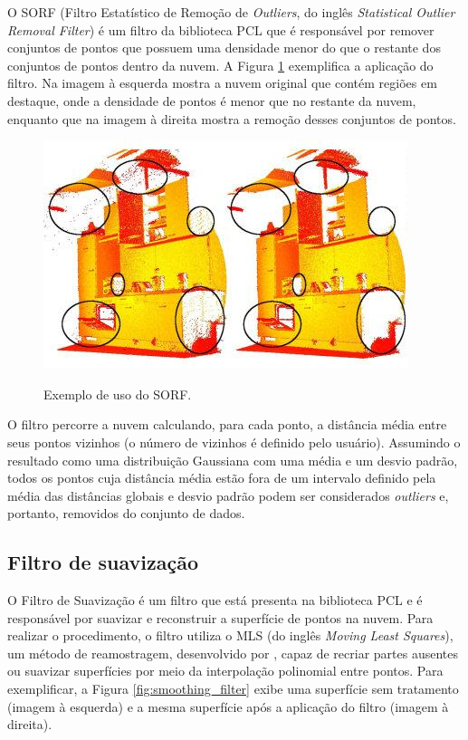 O SORF (Filtro Estatístico de Remoção de \textit{Outliers}, do inglês \textit{Statistical Outlier Removal Filter}) é um filtro da biblioteca PCL que é responsável por remover conjuntos de pontos que possuem uma densidade menor do que o restante dos conjuntos de pontos dentro da nuvem. 
A Figura \ref{fig:outlier_filter} exemplifica a aplicação do filtro. Na imagem à esquerda mostra a nuvem original que contém regiões em destaque, onde a densidade de pontos é menor que no restante da nuvem, enquanto que na imagem à direita mostra a remoção desses conjuntos de pontos.

\begin{figure}[H]
    \centering
    \caption{Exemplo de uso do SORF.}
    \includegraphics[scale=0.6]{dados/figuras/outlier_filter.jpg}
    \label{fig:outlier_filter}
\end{figure}

O filtro percorre a nuvem calculando, para cada ponto, a distância média entre seus pontos vizinhos (o número de vizinhos é definido pelo usuário). Assumindo o resultado como uma distribuição Gaussiana com uma média e um desvio padrão, todos os pontos cuja distância média estão fora de um intervalo definido pela média das distâncias globais e desvio padrão podem ser considerados \textit{outliers} e, portanto, removidos do conjunto de dados.

\subsection{Filtro de suavização}
\label{sec:smoothing_filter}

O Filtro de Suavização é um filtro que está presenta na biblioteca PCL e é responsável por suavizar e reconstruir a superfície de pontos na nuvem. 
Para realizar o procedimento, o filtro utiliza o MLS (do inglês \textit{Moving Least Squares}), um método de reamostragem, desenvolvido por \cite{levin1998mls}, capaz de recriar partes ausentes ou suavizar superfícies por meio da interpolação polinomial entre pontos. 
Para exemplificar, a Figura \ref{fig:smoothing_filter} exibe uma superfície sem tratamento (imagem à esquerda) e a mesma superfície após a aplicação do filtro (imagem à direita).

